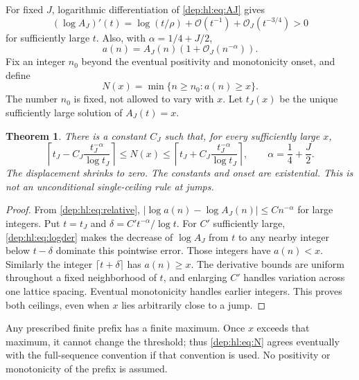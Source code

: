 \documentclass[11pt]{article}
\newtheorem{theorem}{Theorem}[section]
\theoremstyle{definition}\newtheorem{definition}[theorem]{Definition}
\theoremstyle{remark}\newtheorem{remark}[theorem]{Remark}
\newcommand{\OO}{\mathcal O}
\begin{document}
For fixed $J$, logarithmic differentiation of \eqref{dep:hl:eq:AJ} gives
\begin{equation}\label{dep:hl:eq:logder}
 (\log A_J)'(t)=\log(t/\rho)+\OO(t^{-1})+\OO_J(t^{-3/4})>0
\end{equation}
for sufficiently large $t$. Also, with $\alpha=1/4+J/2$,
\begin{equation}\label{dep:hl:eq:relative}
 a(n)=A_J(n)(1+\OO_J(n^{-\alpha})).
\end{equation}
Fix an integer $n_0$ beyond the eventual positivity and monotonicity
onset, and define
\begin{equation}\label{dep:hl:eq:N}
 N(x)=\min\{n\ge n_0:a(n)\ge x\}.
\end{equation}
The number $n_0$ is fixed, not allowed to vary with $x$.
Let $t_J(x)$ be the unique sufficiently large solution of $A_J(t)=x$.

\begin{theorem}\label{dep:hl:thm:inverse}
There is a constant $C_J$ such that, for every sufficiently large $x$,
\begin{equation}\label{dep:hl:eq:ceilings}
 \left\lceil t_J-C_J\frac{t_J^{-\alpha}}{\log t_J}\right\rceil
 \le N(x)\le
 \left\lceil t_J+C_J\frac{t_J^{-\alpha}}{\log t_J}\right\rceil,
 \qquad \alpha=\frac14+\frac J2.
\end{equation}
The displacement shrinks to zero. The constants and onset are
existential. This is not an unconditional single-ceiling rule at jumps.
\end{theorem}
\begin{proof}
From \eqref{dep:hl:eq:relative},
$|\log a(n)-\log A_J(n)|\le Cn^{-\alpha}$ for large integers.
Put $t=t_J$ and $\delta=C't^{-\alpha}/\log t$.
For $C'$ sufficiently large, \eqref{dep:hl:eq:logder} makes the decrease of
$\log A_J$ from $t$ to any nearby integer below $t-\delta$ dominate
this pointwise error. Those integers have $a(n)<x$. Similarly the
integer $\lceil t+\delta\rceil$ has $a(n)\ge x$. The derivative
bounds are uniform throughout a fixed neighborhood of $t$, and
enlarging $C'$ handles variation across one lattice spacing.
Eventual monotonicity handles earlier integers. This proves both
ceilings, even when $x$ lies arbitrarily close to a jump.
\end{proof}
Any prescribed finite prefix has a finite maximum. Once $x$ exceeds
that maximum, it cannot change the threshold; thus \eqref{dep:hl:eq:N}
agrees eventually with the full-sequence convention if that convention
is used. No positivity or monotonicity of the prefix is assumed.
\end{document}
